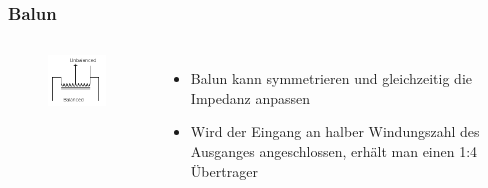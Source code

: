 \begin{frame}
  \frametitle{Balun}
  \begin{columns}
    \begin{center}
      \begin{figure}
        \includegraphics[height=.6\textheight,width=\textwidth,keepaspectratio]{a10/balun.png}
      \end{figure}
    \end{center}
    \begin{itemize}
      \item Balun kann symmetrieren und gleichzeitig die Impedanz anpassen
      \item Wird der Eingang an halber Windungszahl des Ausganges angeschlossen, erhält man einen 1:4 Übertrager
    \end{itemize}
  \end{columns}
\end{frame}

